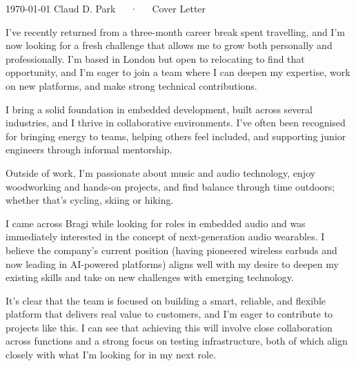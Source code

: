 \documentclass[11pt, a4paper]{awesome-cv}
\begin{document}
\makecvheader[R]

\makecvfooter
  {\today}
  {Claud D. Park~~~·~~~Cover Letter}
  {}

\makelettertitle

\begin{cvletter}

I’ve recently returned from a three-month career break spent travelling, and I’m now looking for a fresh challenge that allows me to grow both personally and professionally. I’m based in London but open to relocating to find that opportunity, and I’m eager to join a team where I can deepen my expertise, work on new platforms, and make strong technical contributions.

I bring a solid foundation in embedded development, built across several industries, and I thrive in collaborative environments. I’ve often been recognised for bringing energy to teams, helping others feel included, and supporting junior engineers through informal mentorship.

Outside of work, I’m passionate about music and audio technology, enjoy woodworking and hands-on projects, and find balance through time outdoors; whether that’s cycling, skiing or hiking.

I came across Bragi while looking for roles in embedded audio and was immediately interested in the concept of next-generation audio wearables. I believe the company’s current position (having pioneered wireless earbuds and now leading in AI-powered platforms) aligns well with my desire to deepen my existing skills and take on new challenges with emerging technology.

It’s clear that the team is focused on building a smart, reliable, and flexible platform that delivers real value to customers, and I’m eager to contribute to projects like this. 
I can see that achieving this will involve close collaboration across functions and a strong focus on testing infrastructure, both of which align closely with what I’m looking for in my next role.


\end{cvletter}
\end{document}
